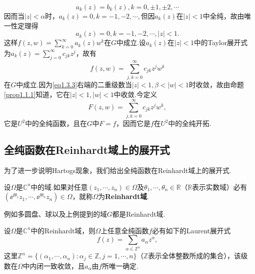 \[a_k(z)=b_k(z),k=0,\pm1,\pm2,\cdots\]
因而当$|z|<\alpha$时，$a_k(z)=0,k=-1,-2,\cdots,$但因$a_k(z)$在$|z|<1$中全纯，故由唯一性定理得
\[a_k(z)=0,k=-1,-2,\cdots,|z|<1.\]
这样$f(z,w)=\sum\limits_{k=0}^\infty a_k(z)w^k$在$G$中成立.设$a_k(z)$在$|z|<1$中的Taylor展开式为$a_k(z)=\sum\limits_{j=0}^\infty c_{jk}z^j$，故有
\begin{equation}\label{eq1.3.3}
	f(z,w)=\sum_{j,k=0}^{\infty}c_{jk}z^j w^k
\end{equation}
在$G$中成立.因为\eqref{eq1.3.3}右端的二重级数当$|z|<1,\beta<|w|<1$时收敛，故由命题\ref{prop1.1.1}知道，它在$|z|<1,|w|<1$中收敛.今定义
\[F(z,w)=\sum_{j,k=0}^\infty c_{jk}z^jw^k,\]
它是$U^2$中的全纯函数，且在$G$中$F=f$，因而它是$f$在$U^2$中的全纯开拓.
\subsection{全纯函数在Reinhardt域上的展开式}
为了进一步说明Hartogs现象，我们给出全纯函数在Reinhardt域上的展开式.
\begin{definition}
	设$\Omega$是$\mathbb{C}^n$中的域.如果对任意$(z_1,\cdots,z_n)\in\Omega$及$\theta_1,\cdots,\theta_n\in\mathbb{R}$（$\mathbb{R}$表示实数域）必有$(\ee^{\ii\theta_1}z_1,\cdots,\ee^{\ii\theta_n}z_n)\in\Omega$，就称$\Omega$为\textbf{Reinhardt域}.
\end{definition}
例如多圆盘、球以及上例提到的域$G$都是Reinhardt域.
\begin{theorem}\label{thm1.3.2}
	设$\Omega$是$\mathbb{C}^n$中的Reinhardt域，则$\Omega$上任意全纯函数$f$必有如下的Laurent展开式
	\begin{equation}\label{eq1.3.4}
		f(z)=\sum_{\alpha\in\mathbb{Z}^n} a_\alpha z^\alpha ,
	\end{equation}
这里$\mathbb{Z}^n=\{(\alpha_1,\cdots,\alpha_n)\colon\alpha_j\in\mathbb{Z},j=1,\cdots,n\}$（$\mathbb{Z}$表示全体整数所成的集合），该级数在$\Omega$中内闭一致收敛，且$a_\alpha$由$f$所唯一确定.
\end{theorem}
